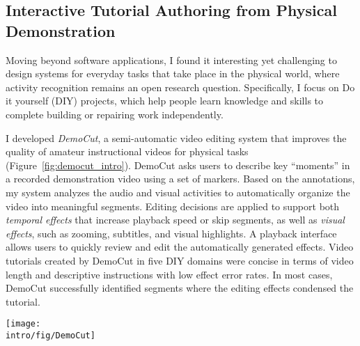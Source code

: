 \subsection{Interactive Tutorial Authoring from Physical Demonstration}


Moving beyond software applications, I found it interesting yet challenging to design systems for everyday tasks that take place in the physical world, where activity recognition remains an open research question.
%
Specifically, I focus on Do it yourself (DIY) projects, which help people learn knowledge and skills to complete building or repairing work independently.

I developed \emph{DemoCut}, a semi-automatic video editing system that improves the quality of amateur instructional videos for physical tasks (Figure~\ref{fig:democut_intro}). DemoCut asks users to describe key ``moments'' in a recorded demonstration video using a set of markers. Based on the annotations, my system analyzes the audio and visual activities to automatically organize the video into meaningful segments. Editing decisions are applied to support both \emph{temporal effects} that increase playback speed or skip segments, as well as \emph{visual effects}, such as zooming, subtitles, and visual highlights. A playback interface allows users to quickly review and edit the automatically generated effects.
%
Video tutorials created by DemoCut in five DIY domains were concise in terms of video length and descriptive instructions with low effect error rates. In most cases, DemoCut successfully identified segments where the editing effects condensed the tutorial.


\begin{figure*}[t]
  \centering
  \texttt{[image: \\intro/fig/DemoCut]}
  \caption{DemoCut asks users to mark key moments in a recorded video of demonstration using a set of marker types. Based on marker information, the system uses audio and video analysis to automatically organize the video into meaningful segments and apply appropriate video editing effects. A playback UI provides lightweight editing for authors to review and modify automatic results.}
  \label{fig:democut_intro}
\end{figure*}

